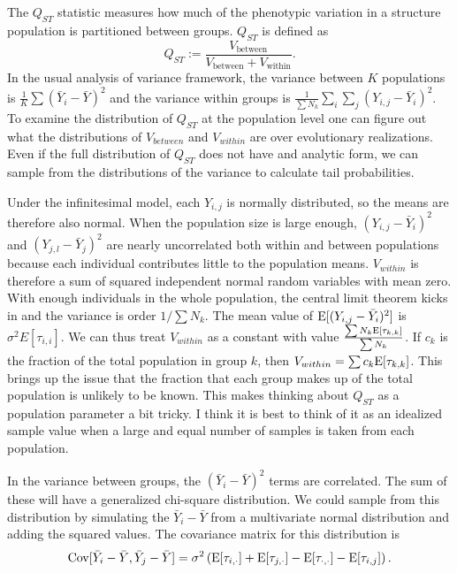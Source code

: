 The $Q_{ST}$ statistic measures how much of the phenotypic variation in a
structure population is partitioned between groups. $Q_{ST}$ is defined as 
\begin{equation}
  \label{eq:qst}
  Q_{ST} := \frac{V_{\text{between}}}{V_{\text{between}} + V_{\text{within}}}.
\end{equation}
In the usual analysis of variance framework, the variance between $K$
populations is $\frac{1}{K} \sum \left( \bar{Y}_i - \bar{Y}\right)^2$ and the
variance within groups is $\frac{1}{\sum N_k} \sum_i \sum_j \left( Y_{i,j} - \bar{Y}_i\right)^2$.
To examine the distribution of $Q_{ST}$ at the population level one can
figure out what the distributions of $V_{between}$ and $V_{within}$ are over
evolutionary realizations. Even if the full distribution of $Q_{ST}$ does not have
and analytic form, we can sample from the distributions of the variance to calculate
tail probabilities.

Under the infinitesimal model, each $Y_{i,j}$ is normally distributed, so the
means are therefore also normal. When the population size is large enough,
$(Y_{i,j} - \bar{Y}_i)^2$ and $(Y_{j,l} - \bar{Y}_j)^2$ are nearly uncorrelated
both within and between populations because each individual contributes little
to the population means. $V_{within}$ is therefore a sum of squared independent
normal random variables with mean zero. With enough individuals in the whole
population, the central limit theorem kicks in and the variance is order $1/\sum N_k$.
The mean value of $\mathrm{E}[(Y_{i,j} - \bar{Y}_i)^2]$ is $\sigma^2E[\tau_{i,i}]$. 
We can thus treat $V_{within}$ as a constant with value $\frac{\sum N_k \mathrm{E}[\tau_{k,k}]}{\sum N_k}$. 
If $c_k$ is the fraction of the total population in group $k$, then $V_{within}=\sum c_k \mathrm{E}[\tau_{k,k}]$. 
This brings up the issue that the fraction that each group makes up of the total
population is unlikely to be known. This makes thinking about $Q_{ST}$ as a population
parameter a bit tricky. I think it is best to think of it as an idealized sample value
when a large and equal number of samples is taken from each population.

In the variance between groups, the $(\bar{Y}_i - \bar{Y})^2$ terms are
correlated. The sum of these will have a generalized chi-square distribution. We
could sample from this distribution by simulating the $\bar{Y}_i - \bar{Y}$ from
a multivariate normal distribution and adding the squared values. The covariance
matrix for this distribution is
\begin{equation}
  \mathrm{Cov}[\bar{Y}_i - \bar{Y}, \bar{Y}_j - \bar{Y}] = \sigma^2\left(
  \mathrm{E}[\tau_{i,\cdot}] + \mathrm{E}[\tau_{j,\cdot}] - \mathrm{E}[\tau_{\cdot,\cdot}] -
  \mathrm{E}[\tau_{i,j}]\right). 
\end{equation}

